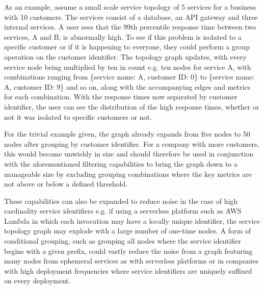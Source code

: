 \documentclass[12pt,pdftex,titlepage]{report}
\begin{document}
                    As an example, assume a small scale service topology of 5 services for a business with 10 customers. The services consist of a database, an API gateway and three internal services. A user sees that the 99th percentile response
                    time between two services, A and B, is abnormally high. To see if this problem is isolated to a specific customer or if it is happening to everyone, they could perform a group operation on the customer identifier. The topology 
                    graph updates, with every service node being multiplied by ten in count e.g. ten nodes for service A, with combinations ranging from \{service name: A, customer ID: 0\} to \{service name: A, customer ID: 9\} and so on, along
                    with the accompanying edges and metrics for each combination. With the response times now separated by customer identifier, the user can see the distribution of the high response times, whether or not it was isolated to 
                    specific customers or not.

                    For the trivial example given, the graph already expands from five nodes to 50 nodes after grouping by customer identifier. For a company with more customers, this would become unwieldy in size and should therefore be used in 
                    conjunction with the aforementioned filtering capabilities to bring the graph down to a manageable size by excluding grouping combinations where the key metrics are not above or below a defined threshold.
                    
                    These capabilities can also be expanded to reduce noise in the case of high cardinality service identifiers e.g. if using a serverless platform such as AWS Lambda in which each invocation may have a locally unique identifier, 
                    the service topology graph may explode with a large number of one-time nodes. A form of conditional grouping, such as grouping all nodes where the service identifier begins with a given prefix, could vastly reduce the noise 
                    from a graph featuring many nodes from ephemeral services as with serverless platforms or in companies with high deployment frequencies where service identifiers are uniquely suffixed on every deployment.
                    

\end{document}
